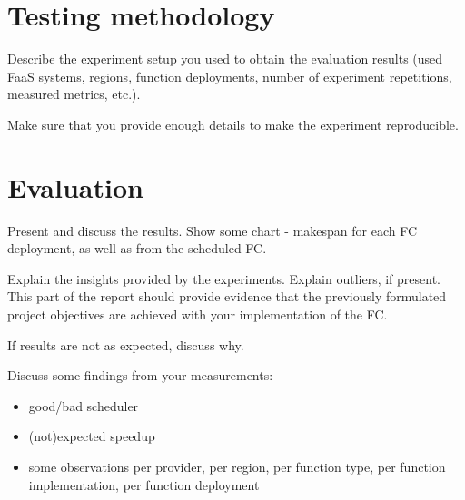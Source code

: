 %
%
%
\section{Testing methodology}

Describe the experiment setup you used to obtain the evaluation results (used FaaS systems, regions, function deployments, number of experiment repetitions, measured metrics, etc.).

Make sure that you provide enough details to make the experiment reproducible.



%
%
%
\section{Evaluation}

Present and discuss the results. Show some chart - makespan for each FC deployment, as well as from the scheduled FC.

Explain the insights provided by the experiments. Explain outliers, if present.
This part of the report should provide evidence that the previously formulated project objectives are achieved with your implementation of the FC.

If results are not as expected, discuss why.

Discuss some findings from your measurements:
\begin{itemize}
    \item good/bad scheduler
    \item (not)expected speedup
    \item some observations per provider, per region, per function type, per function implementation, per function deployment
\end{itemize}
